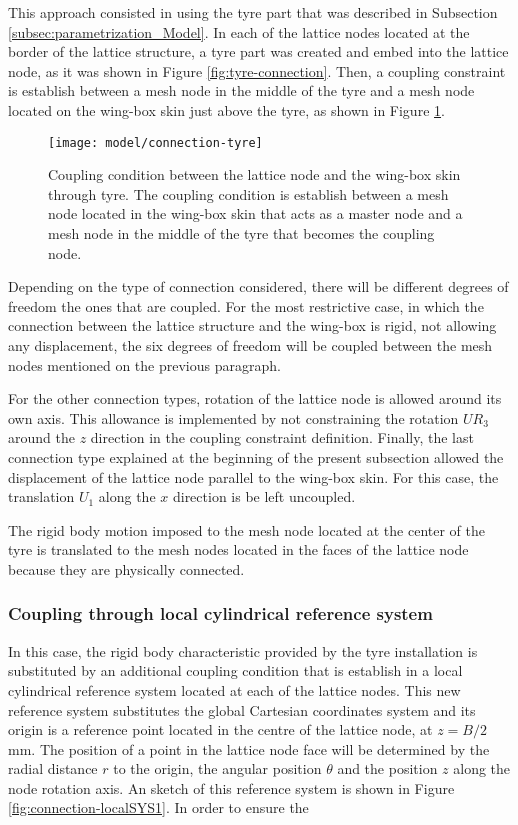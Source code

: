 This approach consisted in using the tyre part that was described in Subsection \ref{subsec:parametrization_Model}. In each of the lattice nodes located at the border of the lattice structure, a tyre part was created and embed into the lattice node, as it was shown in Figure \ref{fig:tyre-connection}. Then, a coupling constraint is establish between a mesh node in the middle of the tyre and a mesh node located on the wing-box skin just above the tyre, as shown in Figure \ref{fig:connection-tyre}.

\begin{figure}[!htpb]
  \centering
  \texttt{[image: model/connection-tyre]}
  \caption[Coupling condition between the lattice node and the wing-box skin through tyre]{Coupling condition between the lattice node and the wing-box skin through tyre. The coupling condition is establish between a mesh node located in the wing-box skin that acts as a master node and a mesh node in the middle of the tyre that becomes the coupling node.}\label{fig:connection-tyre}
\end{figure}

Depending on the type of connection considered, there will be different degrees of freedom the ones that are coupled. For the most restrictive case, in which the connection between the lattice structure and the wing-box is rigid, not allowing any displacement, the six degrees of freedom will be coupled between the mesh nodes mentioned on the previous paragraph.

For the other connection types, rotation of the lattice node is allowed around its own axis. This allowance is implemented by not constraining the rotation $UR_3$ around the $z$ direction in the coupling constraint definition. Finally, the last connection type explained at the beginning of the present subsection allowed the displacement of the lattice node parallel to the wing-box skin. For this case, the translation $U_1$ along the $x$ direction is be left uncoupled.

The rigid body motion imposed to the mesh node located at the center of the tyre is translated to the mesh nodes located in the faces of the lattice node because they are physically connected.

\subsubsection{Coupling through local cylindrical reference system}

In this case, the rigid body characteristic provided by the tyre installation is substituted by an additional coupling condition that is establish in a local cylindrical reference system located at each of the lattice nodes. This new reference system substitutes the global Cartesian coordinates system and its origin is a reference point located in the centre of the lattice node,  at $z=B/2$mm. The position of a point in the lattice node face will be determined by the radial distance $r$ to the origin, the angular position $\theta$ and the position $z$ along the node rotation axis. An sketch of this reference system is shown in Figure \ref{fig:connection-localSYS1}. In order to ensure the 

